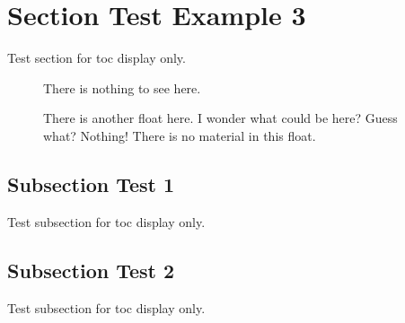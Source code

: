 \section{Section Test Example 3}
Test section for toc display only.

\begin{figure}[!h]
	\caption{There is nothing to see here.}
\end{figure}

\begin{figure}[!h]
	\caption{There is another float here. I wonder what could be here? Guess what? Nothing! There is no material in this float.}
\end{figure}

\subsection{Subsection Test 1}
Test subsection for toc display only.

\subsection{Subsection Test 2}
Test subsection for toc display only.
